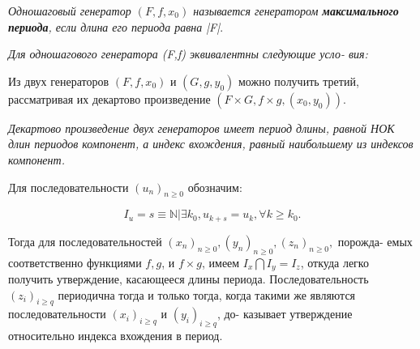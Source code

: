 
\begin{determ} 
\textit{Одношаговый генератор $(F,f,x_{0})$ называется генератором \textbf{максимального периода}, если длина его периода равна |F|}.
\end{determ}
\begin{predl}
\slshape{Для одношагового генератора (F,f) эквивалентны следующие усло- \linebreak вия:} \par 
{}
\indent Из двух генераторов $(F,f,x_{0})$ и $(G,g,y_{0})$ можно получить третий, \linebreak рассматривая их декартово произведение $(F \times G, f \times g, (x_{0}, y_{0})).$
\end{predl}
\begin{predl}
 \slshape{Декартово произведение двух генераторов имеет период длины, \linebreak равной НОК длин периодов компонент, а индекс вхождения, равный \linebreak наибольшему из индексов компонент.}
\end{predl}
\begin{myproof}
 Для последовательности $(u_{n})_{n \geqslant 0}$ обозначим: \par 
 $$I_{u} = {s \equiv \mathbb{N}|\exists k_{0}, u_{k+s} = u_{k}, \forall k \geqslant k_{0}}.$$ \par 
 Тогда для последовательностей $(x_{n})_{n \geqslant 0}, (y_{n})_{n \geqslant 0}, (z_{n})_{n \geqslant 0},$ порожда- \linebreak \indent емых соответственно функциями $f, g$, и $f \times g$, имеем $I_{x} \bigcap I_{y} = I_{z}$, \linebreak \indent откуда легко получить утверждение, касающееся длины периода. \linebreak \indent Последовательность $(z_{i})_{i \geqslant q}$ периодична тогда и только тогда, когда \linebreak \indent такими же являются последовательности $(x_{i})_{i \geqslant q}$ и $(y_{i})_{i \geqslant q}$, до- \linebreak \indent казывает утверждение относительно индекса вхождения в период. \par 
\end{myproof}
